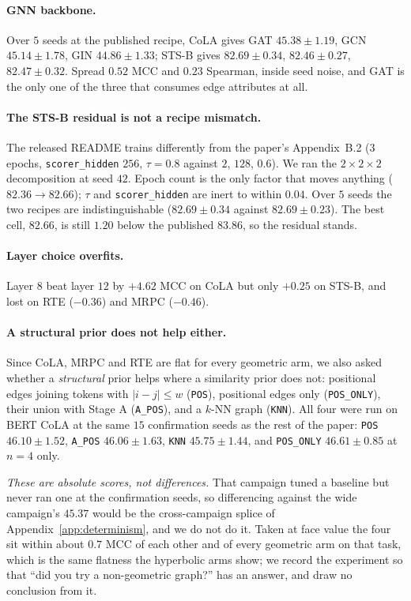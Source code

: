 \documentclass{article}
\begin{document}
\paragraph{GNN backbone.} Over $5$ seeds at the published recipe, CoLA gives GAT
$45.38 \pm 1.19$, GCN $45.14 \pm 1.78$, GIN $44.86 \pm 1.33$; STS-B gives
$82.69 \pm 0.34$, $82.46 \pm 0.27$, $82.47 \pm 0.32$. Spread $0.52$ MCC and
$0.23$ Spearman, inside seed noise, and GAT is the only one of the three that
consumes edge attributes at all.

\paragraph{The STS-B residual is not a recipe mismatch.} The released README
trains differently from the paper's Appendix~B.2 ($3$ epochs,
\texttt{scorer\_hidden} $256$, $\tau = 0.8$ against $2$, $128$, $0.6$). We ran
the $2\times2\times2$ decomposition at seed $42$. Epoch count is the only factor
that moves anything ($82.36 \rightarrow 82.66$); $\tau$ and
\texttt{scorer\_hidden} are inert to within $0.04$. Over $5$ seeds the two
recipes are indistinguishable ($82.69 \pm 0.34$ against $82.69 \pm 0.23$). The
best cell, $82.66$, is still $1.20$ below the published $83.86$, so the residual
stands.

\paragraph{Layer choice overfits.} Layer $8$ beat layer $12$ by $+4.62$ MCC on
CoLA but only $+0.25$ on STS-B, and lost on RTE ($-0.36$) and MRPC ($-0.46$).

\paragraph{A structural prior does not help either.} Since CoLA, MRPC and RTE
are flat for every geometric arm, we also asked whether a \emph{structural}
prior helps where a similarity prior does not: positional edges joining tokens
with $|i-j| \leq w$ (\texttt{POS}), positional edges only
(\texttt{POS\_ONLY}), their union with Stage A (\texttt{A\_POS}), and a $k$-NN
graph (\texttt{KNN}). All four were run on BERT CoLA at the same $15$
confirmation seeds as the rest of the paper: \texttt{POS} $46.10 \pm 1.52$,
\texttt{A\_POS} $46.06 \pm 1.63$, \texttt{KNN} $45.75 \pm 1.44$, and
\texttt{POS\_ONLY} $46.61 \pm 0.85$ at $n=4$ only.

\emph{These are absolute scores, not differences.} That campaign tuned a
baseline but never ran one at the confirmation seeds, so differencing against
the wide campaign's $45.37$ would be the cross-campaign splice of
Appendix~\ref{app:determinism}, and we do not do it. Taken at face value the
four sit within about $0.7$ MCC of each other and of every geometric arm on
that task, which is the same flatness the hyperbolic arms show; we record the
experiment so that ``did you try a non-geometric graph?'' has an answer, and
draw no conclusion from it.
\end{document}
